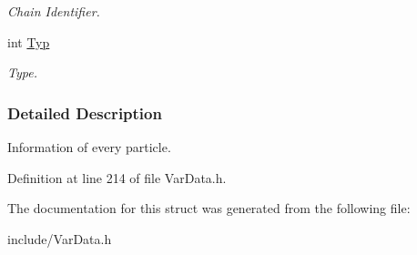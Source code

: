 \begin{DoxyCompactItemize}
\begin{DoxyCompactList}\small\item\em \-Chain \-Identifier. \end{DoxyCompactList}\item 
\hypertarget{structPART_a6365019ac3c6ee60c2db6a3674f35614}{int \hyperlink{structPART_a6365019ac3c6ee60c2db6a3674f35614}{\-Typ}}\label{structPART_a6365019ac3c6ee60c2db6a3674f35614}

\begin{DoxyCompactList}\small\item\em \-Type. \end{DoxyCompactList}\end{DoxyCompactItemize}


\subsubsection{\-Detailed \-Description}
\-Information of every particle. 

\-Definition at line 214 of file \-Var\-Data.\-h.



\-The documentation for this struct was generated from the following file\-:\begin{DoxyCompactItemize}
\item 
include/\-Var\-Data.\-h\end{DoxyCompactItemize}
